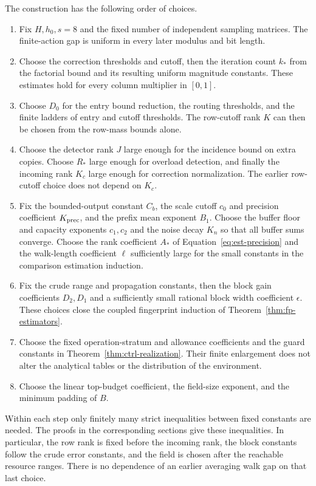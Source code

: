 The construction has the following order of choices.
\begin{enumerate}
\item Fix $H,h_0,s=8$ and the fixed number of independent sampling matrices.
The finite-action gap is uniform in every later modulus and bit length.
\item Choose the correction thresholds and cutoff, then the iteration
count $k_*$ from the factorial bound and its resulting uniform
magnitude constants. These estimates hold for every column multiplier
in $[0,1]$.
\item Choose $D_0$ for the entry bound reduction, the routing thresholds,
and the finite ladders of entry and cutoff thresholds. The row-cutoff
rank $K$ can then be chosen from the row-mass bounds alone.
\item Choose the detector rank $J$ large enough for the incidence
bound on extra copies. Choose $R_*$ large enough for overload
detection, and finally the incoming rank $K_c$ large enough for
correction normalization. The earlier row-cutoff choice does not depend
on $K_c$.
\item Fix the bounded-output constant $C_b$, the scale cutoff $c_0$ and
precision coefficient $K_{\rm prec}$, and the prefix mean exponent $B_1$.
Choose the buffer floor and capacity exponents $c_1,c_2$ and the noise
decay $K_n$ so that all buffer sums converge. Choose the rank coefficient
$A_*$ of Equation~\eqref{eq:est-precision} and the walk-length
coefficient $\ell$ sufficiently large for the small constants in the
comparison estimation induction.
\item Fix the crude range and propagation constants, then the block
gain coefficients $D_2,D_1$ and a sufficiently small rational block
width coefficient $\epsilon$. These choices close the coupled
fingerprint induction of Theorem~\ref{thm:fp-estimators}.
\item Choose the fixed operation-stratum and allowance coefficients
and the guard constants in Theorem~\ref{thm:ctrl-realization}.
Their finite enlargement does not alter the analytical tables or
the distribution of the environment.
\item Choose the linear top-budget coefficient, the field-size
exponent, and the minimum padding of $B$.
\end{enumerate}
Within each step only finitely many strict inequalities between
fixed constants are needed. The proofs in the corresponding sections
give these inequalities. In particular, the row rank is fixed before
the incoming rank, the block constants follow the crude error
constants, and the field is chosen after the reachable resource
ranges. There is no dependence of an earlier averaging walk gap on that
last choice.

